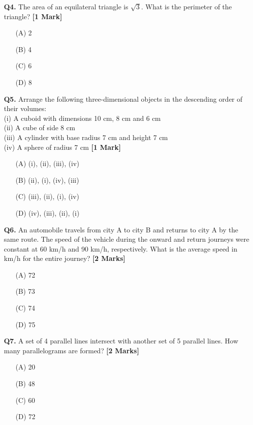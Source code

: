 \documentclass[11pt]{article}
\newcommand{\questiona}[2]{
    \noindent\textbf{Q#2.} #1 \hfill \textbf{[1 Mark]}
}
\newcommand{\questionb}[2]{
    \noindent\textbf{Q#2.} #1 \hfill \textbf{[2 Marks]}
}
\begin{document}
\questiona{The area of an equilateral triangle is \(\sqrt{3}\). What is the perimeter of the triangle?}{4}
\begin{enumerate}
    \item[(A)] 2
    \item[(B)] 4
    \item[(C)] 6
    \item[(D)] 8
\end{enumerate}
\vspace{0.5cm}

\questiona{Arrange the following three-dimensional objects in the descending order of their volumes: \\
(i) A cuboid with dimensions 10 cm, 8 cm and 6 cm \\
(ii) A cube of side 8 cm \\
(iii) A cylinder with base radius 7 cm and height 7 cm \\
(iv) A sphere of radius 7 cm}{5}
\begin{enumerate}
    \item[(A)] (i), (ii), (iii), (iv)
    \item[(B)] (ii), (i), (iv), (iii)
    \item[(C)] (iii), (ii), (i), (iv)
    \item[(D)] (iv), (iii), (ii), (i)
\end{enumerate}
\vspace{0.5cm}

\questionb{An automobile travels from city A to city B and returns to city A by the same route. The speed of the vehicle during the onward and return journeys were constant at 60 km/h and 90 km/h, respectively. What is the average speed in km/h for the entire journey?}{6}
\begin{enumerate}
    \item[(A)] 72
    \item[(B)] 73
    \item[(C)] 74
    \item[(D)] 75
\end{enumerate}
\vspace{0.5cm}

\questionb{A set of 4 parallel lines intersect with another set of 5 parallel lines. How many parallelograms are formed?}{7}
\begin{enumerate}
    \item[(A)] 20
    \item[(B)] 48
    \item[(C)] 60
    \item[(D)] 72
\end{enumerate}
\vspace{0.5cm}
\end{document}
